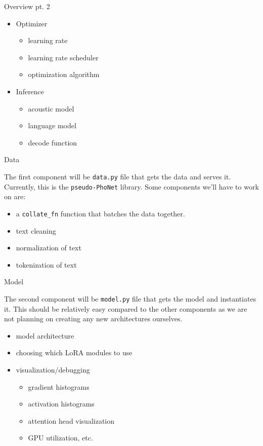 \documentclass{beamer}
\begin{document}
\begin{frame}{Overview pt. 2}
  \begin{itemize}
  \item 
    Optimizer
    \begin{itemize}
    \item learning rate
    \item learning rate scheduler
    \item optimization algorithm
    \end{itemize}
  \item 
    Inference
    \begin{itemize}
    \item acoustic model
    \item language model
    \item decode function
    \end{itemize}
  \end{itemize}
\end{frame}

\begin{frame}{Data}

  The first component will be \texttt{data.py} file that gets the data and serves it.
  Currently, this is the \texttt{pseudo-PhoNet} library.
  Some components we'll have to work on are:
  \begin{itemize}
  \item a \texttt{collate\_fn} function that batches the data together.
  \item text cleaning
  \item normalization of text
  \item tokenization of text
  \end{itemize}
\end{frame}

\begin{frame}{Model}

  The second component will be \texttt{model.py} file that gets the model and instantiates it.
  This should be relatively easy compared to the other components as we are not planning on creating any new
  architectures ourselves.
  \begin{itemize}
    \item model architecture
    \item choosing which LoRA modules to use
    \item visualization/debugging
    \begin{itemize}
      \item gradient histograms
      \item activation histograms
      \item attention head visualization
      \item GPU utilization, etc.
    \end{itemize}
  \end{itemize}
\end{frame}
\end{document}
